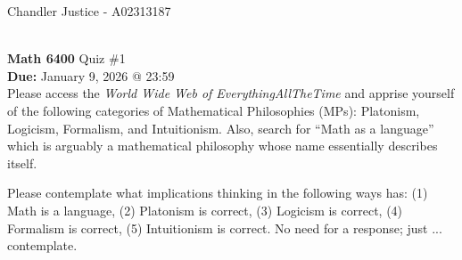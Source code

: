 \documentclass[10pt]{article}
\begin{document}
\begin{flushright}
Chandler Justice - A02313187
\end{flushright}
\noindent \underline{\hspace{3in}}\\
\textbf{Math 6400} Quiz \#1\\
\textbf{Due:} January 9, 2026 @ 23:59\\

	\noindent Please access the \emph{World Wide Web of EverythingAllTheTime} and apprise yourself of the following categories of Mathematical Philosophies (MPs): Platonism, Logicism, Formalism, and Intuitionism. Also, search for ``Math as a language'' which is arguably a mathematical philosophy whose name essentially describes itself.  
	
	\noindent Please contemplate what implications thinking in the following ways has: (1) Math is a language, (2) Platonism is correct, (3) Logicism is correct, (4) Formalism is correct, (5) Intuitionism is correct.  No need for a response; just ... contemplate.
	
\end{document}
